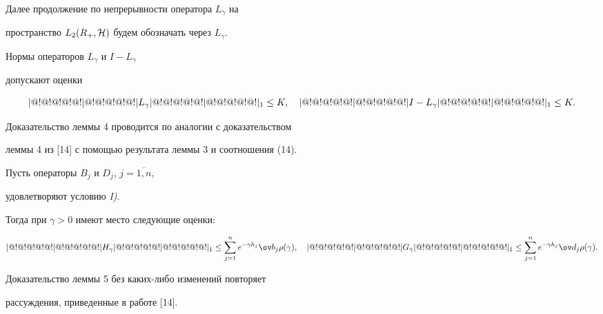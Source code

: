 Далее продолжение по непрерывности оператора $L_{\gamma }$ на


пространство $L_2(R_+,{\cal H} )$ будем обозначать через $L_{\gamma }$.





\begin{lem}


Нормы операторов $L_{\gamma }$ и $I-L_{\gamma }$


допускают оценки


$$


\tri L_{\gamma }\tri_1\leq K ,\quad \tri I-L_{\gamma }\tri_1\leq K .


$$


\end{lem}





Доказательство леммы 4 проводится по аналогии с доказательством


леммы 4 из [14] с помощью результата леммы 3 и соотношения (14).





\begin{lem}


Пусть операторы $B_j$ и $D_j$, $j=\overline{1,n}$,


удовлетворяют условию {\em I)}.


Тогда при $\gamma > 0$ имеют место следующие оценки${:}$


$$


\tri H_{\gamma }\tri_1\leq \sum\limits_{j=1}^ne^{-\gamma h_j}{\ov


b}_j\rho (\gamma ), \quad \tri G_{\gamma }\tri_1\leq


\sum\limits_{j=1}^ne^{-\gamma h_j}{\ov d}_j\rho (\gamma ).


$$


\end{lem}





Доказательство леммы 5 без каких-либо изменений повторяет


рассуждения, приведенные в работе [14].





